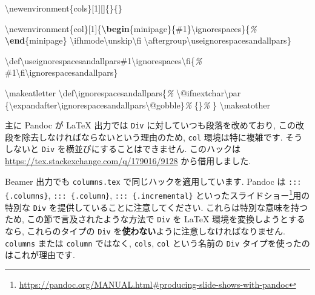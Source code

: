 \documentclass[
  11pt,
]{bxjsreport}
\newenvironment{Shaded}{\begin{snugshade}}{\end{snugshade}}
\newcommand{\CommentTok}[1]{\textcolor[rgb]{0.56,0.35,0.01}{\textit{#1}}}
\newcommand{\ExtensionTok}[1]{#1}
\newcommand{\FunctionTok}[1]{\textcolor[rgb]{0.00,0.00,0.00}{#1}}
\newcommand{\KeywordTok}[1]{\textcolor[rgb]{0.13,0.29,0.53}{\textbf{#1}}}
\newcommand{\NormalTok}[1]{#1}
\renewcommand{\href}[2]{#2\footnote{\url{#1}}}
\begin{document}
\begin{Shaded}
\begin{Highlighting}[]
\FunctionTok{\textbackslash{}newenvironment}\NormalTok{\{cols\}[1][]\{\}\{\}}

\FunctionTok{\textbackslash{}newenvironment}\NormalTok{\{col\}[1]\{}\KeywordTok{\textbackslash{}begin}\NormalTok{\{}\ExtensionTok{minipage}\NormalTok{\}\{\#1\}}\FunctionTok{\textbackslash{}ignorespaces}\NormalTok{\}\{}\CommentTok{\%}
\KeywordTok{\textbackslash{}end}\NormalTok{\{}\ExtensionTok{minipage}\NormalTok{\}}
\FunctionTok{\textbackslash{}ifhmode\textbackslash{}unskip\textbackslash{}fi}
\FunctionTok{\textbackslash{}aftergroup\textbackslash{}useignorespacesandallpars}\NormalTok{\}}

\FunctionTok{\textbackslash{}def\textbackslash{}useignorespacesandallpars}\NormalTok{\#1}\FunctionTok{\textbackslash{}ignorespaces\textbackslash{}fi}\NormalTok{\{}\CommentTok{\%}
\NormalTok{\#1}\FunctionTok{\textbackslash{}fi\textbackslash{}ignorespacesandallpars}\NormalTok{\}}

\FunctionTok{\textbackslash{}makeatletter}
\FunctionTok{\textbackslash{}def\textbackslash{}ignorespacesandallpars}\NormalTok{\{}\CommentTok{\%}
  \FunctionTok{\textbackslash{}@ifnextchar\textbackslash{}par}
\NormalTok{    \{}\FunctionTok{\textbackslash{}expandafter\textbackslash{}ignorespacesandallpars\textbackslash{}@gobble}\NormalTok{\}}\CommentTok{\%}
\NormalTok{    \{\}}\CommentTok{\%}
\NormalTok{\}}
\FunctionTok{\textbackslash{}makeatother}
\end{Highlighting}
\end{Shaded}

主に Pandoc が LaTeX 出力では \texttt{Div} に対していつも段落を改めており, この改段を除去しなければならないという理由のため, \texttt{col} 環境は特に複雑です. そうしないと \texttt{Div} を横並びにすることはできません. このハックは \url{https://tex.stackexchange.com/q/179016/9128} から借用しました.

Beamer 出力でも \texttt{columns.tex} で同じハックを適用しています. Pandoc は \texttt{::: \{.columns\}}, \texttt{::: \{.column\}}, \texttt{::: \{.incremental\}} といった\href{https://pandoc.org/MANUAL.html\#producing-slide-shows-with-pandoc}{スライドショー}用の特別な \texttt{Div} を提供していることに注意してください. これらは特別な意味を持つため, この節で言及されたような方法で \texttt{Div} を LaTeX 環境を変換しようとするなら, これらのタイプの \texttt{Div} を\textbf{使わない}ように注意しなければなりません. \texttt{columns} または \texttt{column} ではなく, \texttt{cols}, \texttt{col} という名前の \texttt{Div} タイプを使ったのはこれが理由です.
\end{document}
